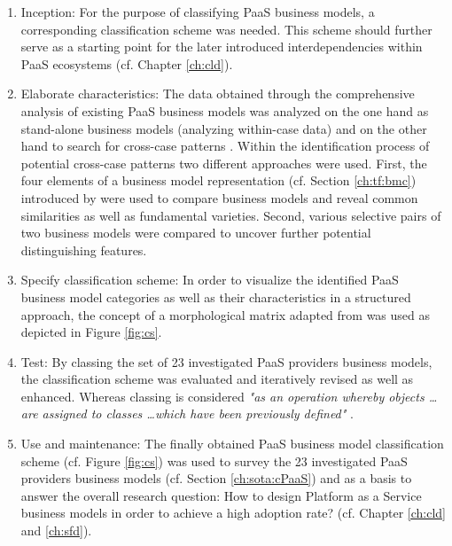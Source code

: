 \begin{enumerate}
	\item Inception: For the purpose of classifying \ac{PaaS} business models, a corresponding classification scheme was needed. This scheme should further serve as a starting point for the later introduced interdependencies within \ac{PaaS} ecosystems (cf. Chapter \ref{ch:cld}).

	\item Elaborate characteristics: The data obtained through the comprehensive analysis of existing \ac{PaaS} business models was analyzed on the one hand as stand-alone business models (analyzing within-case data) and on the other hand to search for cross-case patterns \citep[pp. 539-540]{Eisenhardt1989}. Within the identification process of potential cross-case patterns two different approaches were used. First, the four elements of a business model representation (cf. Section \ref{ch:tf:bmc}) introduced by \citet{Johnson2008} were used to compare business models and reveal common similarities as well as fundamental varieties. Second, various selective pairs of two business models were compared to uncover further potential distinguishing features. 

	\item Specify classification scheme: In order to visualize the identified \ac{PaaS} business model categories as well as their characteristics in a structured approach, the concept of a morphological matrix adapted from \citet{ Zwicky1969} was used as depicted in Figure \ref{fig:cs}.

	\item Test: By classing the set of 23 investigated \ac{PaaS} providers business models, the classification scheme was evaluated and iteratively revised as well as enhanced. Whereas classing is considered \textit{"as an operation whereby objects \ldots are assigned to classes \ldots which have been previously defined"} \citep[p. 130]{Marradi1990}.

	\item Use and maintenance: The finally obtained \ac{PaaS} business model classification scheme (cf. Figure \ref{fig:cs}) was used to survey the 23 investigated \ac{PaaS} providers business models (cf. Section \ref{ch:sota:cPaaS}) and as a basis to answer the overall research question: How to design Platform as a Service business models in order to achieve a high adoption rate? (cf. Chapter \ref{ch:cld} and \ref{ch:sfd}).
\end{enumerate}

